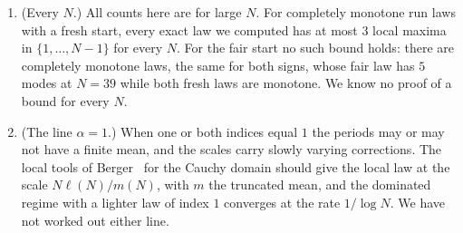 \begin{enumerate}[(1)]
threshold curve in the $(\alpha_\plus,\alpha_\minus)$ square runs from $(\alpha_1,\alpha_1)$ to
$(1/2,1)$. Every exact law we computed agrees with this.
\item (Every $N$.) All counts here are for large $N$. For completely monotone run laws with a
fresh start, every exact law we computed has at most $3$ local maxima in $\{1,\dots,N-1\}$ for
every $N$. For the fair start no such bound holds: there are completely monotone laws, the
same for both signs, whose fair law has $5$ modes at $N=39$ while both fresh laws are
monotone. We know no proof of a bound for every $N$.
\item (The line $\alpha=1$.) When one or both indices equal $1$ the periods may or may not have
a finite mean, and the scales carry slowly varying corrections. The local tools of
Berger~\cite{berger2019ptrf} for the Cauchy domain should give the local law at the scale
$N\ell(N)/m(N)$, with $m$ the truncated mean, and the dominated regime with a lighter law of
index $1$ converges at the rate $1/\log N$. We have not worked out either line.
\end{enumerate}
